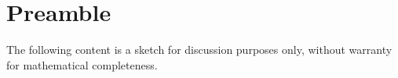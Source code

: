 \section*{Preamble}
\label{s:preamble}
The following content is a sketch for discussion purposes only, without warranty for mathematical completeness.
